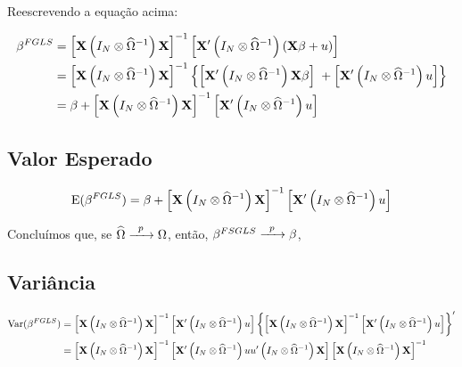 \documentclass[11pt, oneside, a4paper, article]{article}
\numberwithin{equation}{section}
\begin{document}
\begin{description}
\begin{description}
Reescrevendo a equação acima:

\vspace{-1.5 em}
\begin{align*}
\beta^{FGLS}
&= 
\left[  \mathbf{X} \left( I_{N} \otimes \widehat{\Omega}^{-1} \right) \mathbf{X} \right]^{-1}
\left[  \mathbf{X}' \left( I_{N} \otimes \widehat{\Omega}^{-1} \right) (\mathbf{X} \beta + u) \right]
\\
&= 
\left[ \mathbf{X} \left( I_{N} \otimes \widehat{\Omega}^{-1} \right) \mathbf{X} \right]^{-1}
\left\{ 
\left[ \mathbf{X}' \left( I_{N} \otimes \widehat{\Omega}^{-1} \right) \mathbf{X} \beta \right]
\; +
\left[ \mathbf{X}' \left( I_{N} \otimes \widehat{\Omega}^{-1} \right) u \right]
\right\}
\\
&= 
\beta +
\left[ \mathbf{X} \left( I_{N} \otimes \widehat{\Omega}^{-1} \right) \mathbf{X} \right]^{-1}
\left[ \mathbf{X}' \left( I_{N} \otimes \widehat{\Omega}^{-1} \right) u \right]
\end{align*}

\subsection*{Valor Esperado}

\vspace{-1 em}
\begin{align*}
\text{E}(\beta^{FGLS})
= 
\beta +
\left[ \mathbf{X} \left( I_{N} \otimes \widehat{\Omega}^{-1} \right) \mathbf{X} \right]^{-1}
\left[ \mathbf{X}' \left( I_{N} \otimes \widehat{\Omega}^{-1} \right) u \right]
\end{align*}

Concluímos que, se 
$\widehat{\Omega} \xrightarrow{\enskip p \enskip} \Omega$,
então,
$\beta^{FSGLS} \xrightarrow{\enskip p \enskip} \beta$,

\subsection*{Variância}

\vspace{-1 em}
\begin{align*}
\text{Var}(\beta^{FGLS})
&= 
\left[ \mathbf{X} \left( I_{N} \otimes \widehat{\Omega}^{-1} \right) \mathbf{X} \right]^{-1}
\left[ \mathbf{X}' \left( I_{N} \otimes \widehat{\Omega}^{-1} \right) u \right]
\left\{ 
\left[ \mathbf{X} \left( I_{N} \otimes \widehat{\Omega}^{-1} \right) \mathbf{X} \right]^{-1}
\left[ \mathbf{X}' \left( I_{N} \otimes \widehat{\Omega}^{-1} \right) u \right]
\right\}^{\prime}
\\
&=
\left[ \mathbf{X} \left( I_{N} \otimes \widehat{\Omega}^{-1} \right) \mathbf{X} \right]^{-1}
\left[
\mathbf{X}' \left( I_{N} \otimes \widehat{\Omega}^{-1} \right) 
u u'
\left( I_{N} \otimes \widehat{\Omega}^{-1} \right) \mathbf{X}
\right]
\left[ \mathbf{X} \left( I_{N} \otimes \widehat{\Omega}^{-1} \right) \mathbf{X} \right]^{-1}
\end{align*}


\end{description}
\end{description}
\end{document}

